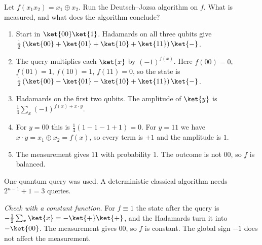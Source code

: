 
\begin{exercisebox}
\begin{pproblem}[Deutsch--Jozsa with $n = 2$]\label{pp:dj}
    Let $f(x_1 x_2) = x_1 \oplus x_2$. Run the Deutsch--Jozsa algorithm on $f$. What is measured,
    and what does the algorithm conclude?
\end{pproblem}
\tcblower
\begin{wsolution}
    \leavevmode
    \begin{enumerate}
        \item Start in $\ket{00}\ket{1}$. Hadamards on all three qubits give
              $\frac{1}{2}\left(\ket{00} + \ket{01} + \ket{10} + \ket{11}\right)\ket{-}$.
        \item The query multiplies each $\ket{x}$ by $(-1)^{f(x)}$. Here $f(00) = 0$, $f(01) = 1$,
              $f(10) = 1$, $f(11) = 0$, so the state is
              $\frac{1}{2}\left(\ket{00} - \ket{01} - \ket{10} + \ket{11}\right)\ket{-}$.
        \item Hadamards on the first two qubits. The amplitude of $\ket{y}$ is
              $\frac{1}{4} \sum_{x} (-1)^{f(x) + x \cdot y}$.
        \item For $y = 00$ this is $\frac{1}{4}(1 - 1 - 1 + 1) = 0$. For $y = 11$ we have
              $x \cdot y = x_1 \oplus x_2 = f(x)$, so every term is $+1$ and the amplitude is $1$.
        \item The measurement gives $11$ with probability $1$. The outcome is not $00$, so $f$ is
              balanced.
    \end{enumerate}
    One quantum query was used. A deterministic classical algorithm needs $2^{n-1} + 1 = 3$ queries.

    \emph{Check with a constant function.} For $f \equiv 1$ the state after the query is
    $-\frac{1}{2} \sum_{x} \ket{x} = -\ket{+}\ket{+}$, and the Hadamards turn it into $-\ket{00}$.
    The measurement gives $00$, so $f$ is constant. The global sign $-1$ does not affect the
    measurement.
\end{wsolution}
\end{exercisebox}

